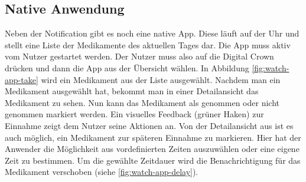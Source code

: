 \subsection{Native Anwendung}
Neben der Notification gibt es noch eine native App. Diese läuft auf der Uhr und stellt eine Liste der Medikamente des aktuellen Tages dar. Die App muss aktiv vom Nutzer gestartet werden. Der Nutzer muss also auf die Digital Crown drücken und dann die App aus der Übersicht wählen. In Abbildung \ref{fig:watch-app-take} wird ein Medikament aus der Liste ausgewählt. Nachdem man ein Medikament ausgewählt hat, bekommt man in einer Detailansicht das Medikament zu sehen. Nun kann das Medikament als genommen oder nicht genommen markiert werden. Ein visuelles Feedback (grüner Haken) zur Einnahme zeigt dem Nutzer seine Aktionen an. Von der Detailansicht aus ist es auch möglich, ein Medikament zur späteren Einnahme zu markieren. Hier hat der Anwender die Möglichkeit aus vordefinierten Zeiten auszuwählen oder eine eigene Zeit zu bestimmen. Um die gewählte Zeitdauer wird die Benachrichtigung für das Medikament verschoben (siehe \ref{fig:watch-app-delay}). 

